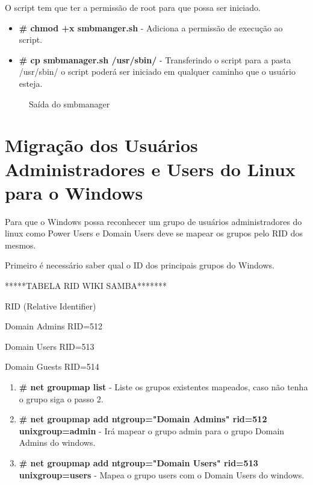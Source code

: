O script tem que ter a permissão de root para que possa ser iniciado.

\begin{itemize}
	\item \textbf{\# chmod +x smbmanger.sh} - Adiciona a permissão de execução ao script.
	\item \textbf{\# cp smbmanager.sh /usr/sbin/} - Transferindo o script para a pasta /usr/sbin/ o script poderá ser iniciado em qualquer caminho que o usuário esteja.
\end{itemize}

\begin{figure}[ht]
   	\centering
   	\caption{Saída do smbmanager}
    \label{smbmanager}
\end{figure}

\section{Migração dos Usuários Administradores e Users do Linux para o Windows}

Para que o Windows possa reconhecer um grupo de usuários administradores do linux como Power Users e Domain Users deve se mapear os grupos pelo RID dos mesmos.

Primeiro é necessário saber qual o ID dos principais grupos do Windows.

*****TABELA RID WIKI SAMBA*******

RID (Relative Identifier) 

Domain Admins RID=512 

Domain Users RID=513 

Domain Guests RID=514

\begin{enumerate}
	\item \textbf{\# net groupmap list} - Liste os grupos existentes mapeados, caso não tenha o grupo siga o passo 2.		
	\item \textbf{\# net groupmap add ntgroup="Domain Admins" rid=512 unixgroup=admin} - Irá mapear o grupo admin para o grupo Domain Admins do windows.
	\item \textbf{\# net groupmap add ntgroup="Domain Users" rid=513 unixgroup=users} - Mapea o grupo users com o Domain Users do windows.
\end{enumerate}

